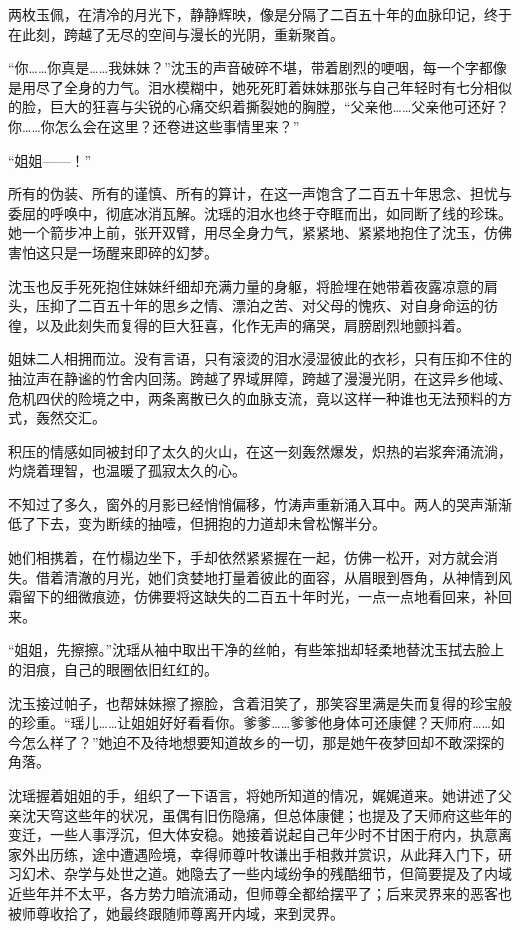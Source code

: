 两枚玉佩，在清冷的月光下，静静辉映，像是分隔了二百五十年的血脉印记，终于在此刻，跨越了无尽的空间与漫长的光阴，重新聚首。

“你……你真是……我妹妹？”沈玉的声音破碎不堪，带着剧烈的哽咽，每一个字都像是用尽了全身的力气。泪水模糊中，她死死盯着妹妹那张与自己年轻时有七分相似的脸，巨大的狂喜与尖锐的心痛交织着撕裂她的胸膛，“父亲他……父亲他可还好？你……你怎么会在这里？还卷进这些事情里来？”

“姐姐——！”

所有的伪装、所有的谨慎、所有的算计，在这一声饱含了二百五十年思念、担忧与委屈的呼唤中，彻底冰消瓦解。沈瑶的泪水也终于夺眶而出，如同断了线的珍珠。她一个箭步冲上前，张开双臂，用尽全身力气，紧紧地、紧紧地抱住了沈玉，仿佛害怕这只是一场醒来即碎的幻梦。

沈玉也反手死死抱住妹妹纤细却充满力量的身躯，将脸埋在她带着夜露凉意的肩头，压抑了二百五十年的思乡之情、漂泊之苦、对父母的愧疚、对自身命运的彷徨，以及此刻失而复得的巨大狂喜，化作无声的痛哭，肩膀剧烈地颤抖着。

姐妹二人相拥而泣。没有言语，只有滚烫的泪水浸湿彼此的衣衫，只有压抑不住的抽泣声在静谧的竹舍内回荡。跨越了界域屏障，跨越了漫漫光阴，在这异乡他域、危机四伏的险境之中，两条离散已久的血脉支流，竟以这样一种谁也无法预料的方式，轰然交汇。

积压的情感如同被封印了太久的火山，在这一刻轰然爆发，炽热的岩浆奔涌流淌，灼烧着理智，也温暖了孤寂太久的心。

\vspace{2em}

不知过了多久，窗外的月影已经悄悄偏移，竹涛声重新涌入耳中。两人的哭声渐渐低了下去，变为断续的抽噎，但拥抱的力道却未曾松懈半分。

她们相携着，在竹榻边坐下，手却依然紧紧握在一起，仿佛一松开，对方就会消失。借着清澈的月光，她们贪婪地打量着彼此的面容，从眉眼到唇角，从神情到风霜留下的细微痕迹，仿佛要将这缺失的二百五十年时光，一点一点地看回来，补回来。

“姐姐，先擦擦。”沈瑶从袖中取出干净的丝帕，有些笨拙却轻柔地替沈玉拭去脸上的泪痕，自己的眼圈依旧红红的。

沈玉接过帕子，也帮妹妹擦了擦脸，含着泪笑了，那笑容里满是失而复得的珍宝般的珍重。“瑶儿……让姐姐好好看看你。爹爹……爹爹他身体可还康健？天师府……如今怎么样了？”她迫不及待地想要知道故乡的一切，那是她午夜梦回却不敢深探的角落。

沈瑶握着姐姐的手，组织了一下语言，将她所知道的情况，娓娓道来。她讲述了父亲沈天穹这些年的状况，虽偶有旧伤隐痛，但总体康健；也提及了天师府这些年的变迁，一些人事浮沉，但大体安稳。她接着说起自己年少时不甘困于府内，执意离家外出历练，途中遭遇险境，幸得师尊叶牧谦出手相救并赏识，从此拜入门下，研习幻术、杂学与处世之道。她隐去了一些内域纷争的残酷细节，但简要提及了内域近些年并不太平，各方势力暗流涌动，但师尊全都给摆平了；后来灵界来的恶客也被师尊收拾了，她最终跟随师尊离开内域，来到灵界。

